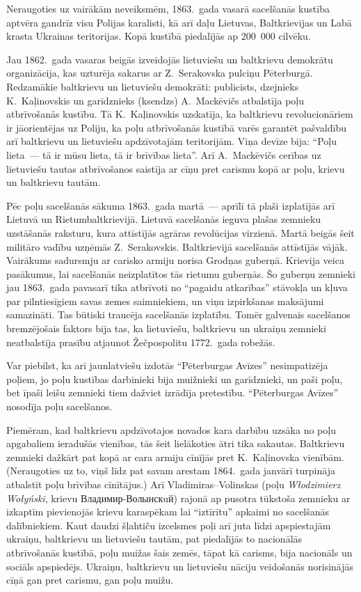 \documentclass[twoside,a5paper,12pt,fleqn,openany]{extbook}
\newcommand{\pltxti}[1]{\textit{\textpolish{#1}}}
\newcommand{\rutxti}[1]{\textrussian{#1}}
\begin{document}
Neraugoties uz vairākām neveiksmēm, 1863.~gada vasarā sacelšanās kustība aptvēra gandrīz visu Polijas karalisti, kā arī daļu Lietuvas, Baltkrievijas un Labā krasta Ukrainas teritorijas. Kopā kustībā piedalījās ap 200~000 cilvēku.

Jau 1862.~gada vasaras beigās izveidojās lietuviešu un baltkrievu demokrātu organizācija, kas uzturēja sakarus ar Z.~Serakovska pulciņu Pēterburgā. Redzamākie baltkrievu un lietuviešu demokrāti: publicists, dzejnieks K.~Kaļinovskis un garīdznieks (ksendzs) A.~Mackēvičs atbalstīja poļu atbrīvošanās kustību. Tā K.~Kaļinovskis uzskatīja, ka baltkrievu revolucionāriem ir jāorientējas uz Poliju, ka poļu atbrīvošanās kustībā varēs garantēt pašvaldību arī baltkrievu un lietuviešu apdzīvotajām teritorijām. Viņa devīze bija: ``Poļu lieta~--- tā ir mūsu lieta, tā ir brīvības lieta''. Arī A.~Mackēvičs cerības uz lietuviešu tautas atbrīvošanos saistīja ar cīņu pret carismu kopā ar poļu, krievu un baltkrievu tautām.

Pēc poļu sacelšanās sākuma 1863.~gada martā~--- aprīlī tā plaši izplatījās arī Lietuvā un Rietumbaltkrievijā. Lietuvā sacelšanās ieguva plašas zemnieku uzstāšanās raksturu, kura attīstījās agrāras revolūcijas virzienā. Martā beigās šeit militāro vadību uzņēmās Z.~Serakovskis. Baltkrievijā sacelšanās attīstījās vājāk. Vairākums sadursmju ar carisko armiju norisa Grodņas guberņā. Krievija veica pasākumus, lai sacelšanās neizplatītos tās rietumu guberņās. Šo guberņu zemnieki jau 1863.~gada pavasarī tika atbrīvoti no ``pagaidu atkarības'' stāvokļa un kļuva par pilntiesīgiem savas zemes saimniekiem, un viņu izpirkšanas maksājumi samazināti. Tas būtiski traucēja sacelšanās izplatību. Tomēr galvenais sacelšanos bremzējošais faktors bija tas, ka lietuviešu, baltkrievu un ukraiņu zemnieki neatbalstīja prasību atjaunot Žečpospolitu 1772.~gada robežās.

Var piebilst, ka arī jaunlatviešu izdotās ``Pēterburgas Avīzes'' nesimpatizēja poļiem, jo poļu kustības darbinieki bija muižnieki un garīdznieki, un paši poļu, bet īpaši leišu zemnieki tiem dažviet izrādīja pretestību. ``Pēterburgas Avīzes'' nosodīja poļu sacelšanos.

Piemēram, kad baltkrievu apdzīvotajos novados kara darbību uzsāka no poļu apgabaliem ieradušās vienības, tās šeit lielākoties ātri tika sakautas. Baltkrievu zemnieki dažkārt pat kopā ar cara armiju cīnījās pret K.~Kaļinovska vienībām. (Neraugoties uz to, viņš līdz pat savam arestam 1864.~gada janvārī turpināja atbalstīt poļu brīvības cīnītājus.) Arī Vladimiras--Volinskas (poļu \pltxti{Włodzimierz Wołyński}, krievu \rutxti{Владимир-Волынскuй}) rajonā ap pusotra tūkstoša zemnieku ar izkaptīm pievienojās krievu karaspēkam lai ``iztīrītu'' apkaimi no sacelšanās dalībniekiem. Kaut daudzi šļahtiču izcelsmes poļi arī juta līdzi apspiestajām ukraiņu, baltkrievu un lietuviešu tautām, pat piedalījās to nacionālās atbrīvošanās kustībā, poļu muižas šais zemēs, tāpat kā carisms, bija nacionāls un sociāls apspiedējs. Ukraiņu, baltkrievu un lietuviešu nāciju veidošanās norisinājās cīņā gan pret carismu, gan poļu muižu.
\end{document}
